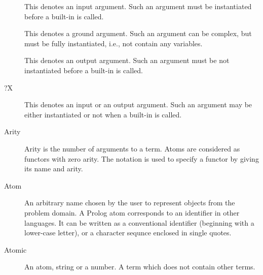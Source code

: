 \begin{description}

\item[]
This denotes an input argument. Such an argument must be instantiated before
a built-in is called.

\item[]
This denotes a ground argument. Such an argument can be complex,
but must be fully instantiated, i.e., not contain any variables.

\item[]
This denotes an output argument. Such an argument must be not
instantiated before a built-in is called.

\item[?X]
This denotes an input or an output argument. Such an argument may be either
instantiated or not  when a built-in is called.


\item[Arity]
Arity is the number of arguments to a term.
Atoms are considered as functors with zero arity.
The notation 
is used to specify a functor by giving its name and arity.

\item[Atom]
An arbitrary name chosen by the user to represent objects from the
problem domain.
A Prolog atom corresponds to an identifier in other languages.  It can be
written as a conventional identifier (beginning with a lower-case letter), or
a character sequnce enclosed in single quotes.

\item[Atomic]
An atom, string or a number. A term which does not contain other terms.


\end{description}

